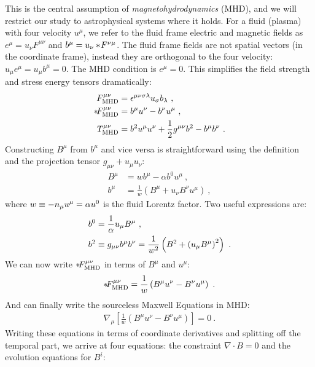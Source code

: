   This is the central assumption of \emph{magnetohydrodynamics} (MHD), and we will restrict our study to astrophysical systems where it holds.  For a fluid (plasma) with four velocity $u^\mu$, we refer to the fluid frame electric and magnetic fields as $e^\mu = u_\nu F^{\mu\nu}$ and $b^\mu = u_\nu*\! F^{\nu\mu}$. The fluid frame fields are not spatial vectors (in the coordinate frame), instead they are orthogonal to the four velocity: $u_\mu e^\mu = u_\mu b^\mu = 0$.  The MHD condition is $e^\mu = 0$.  This simplifies the field strength  and stress energy  tensors dramatically:
  \begin{align}
  	F^{\mu\nu}_{\text{MHD}} &= \eps^{\mu\nu\sig\lam}u_\sig b_\lam \ , \eqlabel{FMHD} \\
	\dualt{F}^{\mu\nu}_{\text{MHD}} &= b^\mu u^\nu - b^\nu u^\mu \ , \eqlabel{dFMHD} \\
  	T^{\mu\nu}_{\text{MHD}} &=  b^2 u^\mu u^\nu  + \frac{1}{2}g^{\mu\nu} b^2  - b^\mu b^\nu\ . \eqlabel{TMHD}
  \end{align}
    Constructing $B^\mu$ from $b^\mu$ and vice versa is straightforward using the definition  and the projection tensor $g_{\mu\nu} + u_\mu u_\nu$:
    \begin{align}
    	B^\mu &= w b^\mu - \alpha b^0 u^\mu \ , \\
	b^\mu &= \frac{1}{w}\left(B^\mu + u_\nu B^\nu u^\mu\right) \ ,
    \end{align}
    where $w \equiv -n_\mu u^\mu = \alpha u^0$ is the fluid Lorentz factor.  Two useful expressions are:
    \begin{align}
    	b^0 &= \frac{1}{\alpha} u_\mu B^\mu \ , \\
	b^2 &\equiv g_{\mu\nu} b^\mu b^\nu = \frac{1}{w^2}\left(B^2 + \left(u_\mu B^\mu\right)^2\right) \ .
    \end{align}
    We can now write $*\! F^{\mu\nu}_{\text{MHD}}$ in terms of $B^\mu$ and $u^\mu$:
    \begin{equation}
    	\dualt{F}^{\mu\nu}_{\text{MHD}} = \frac{1}{w}\left(B^\mu u^\nu - B^\nu u^\mu\right) \ . \eqlabel{FmunuMHD}
    \end{equation}
    And can finally write the sourceless Maxwell Equations  in MHD:
    \begin{align}
    	\nabla_\mu \left[\frac{1}{w}\left(B^\mu u^\nu - B^\nu u^\mu\right)\right] = 0\ .
    \end{align}
    Writing these equations in terms of coordinate derivatives and splitting off the temporal part, we arrive at four equations: the constraint $\nabla \cdot B = 0$ and the evolution equations for $B^i$:
